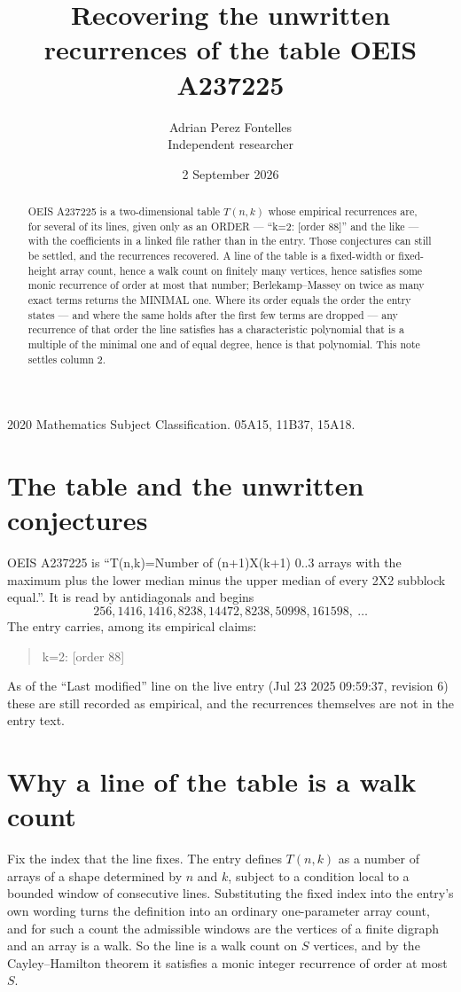 \documentclass[11pt,a4paper]{article}
\title{Recovering the unwritten recurrences of the table OEIS A237225}
\author{Adrian Perez Fontelles\\ \small Independent researcher}
\date{2 September 2026}
\theoremstyle{plain}
\theoremstyle{definition}
\begin{document}
\maketitle

\begin{abstract}
OEIS A237225 is a two-dimensional table $T(n,k)$ whose empirical recurrences are, for several of
its lines, given only as an ORDER --- ``k=2: [order 88]'' and the like --- with the
coefficients in a linked file rather than in the entry. Those conjectures can still be settled,
and the recurrences recovered. A line of the table is a fixed-width or fixed-height array
count, hence a walk count on finitely many vertices, hence satisfies some monic recurrence of
order at most that number; Berlekamp--Massey on twice as many exact terms returns the MINIMAL
one. Where its order equals the order the entry states --- and where the same holds after the
first few terms are dropped --- any recurrence of that order the line satisfies has a
characteristic polynomial that is a multiple of the minimal one and of equal degree, hence is
that polynomial. This note settles column 2.
\end{abstract}

\noindent\small 2020 Mathematics Subject Classification. 05A15, 11B37, 15A18.\normalsize

\section{The table and the unwritten conjectures}

OEIS A237225 is ``T(n,k)=Number of (n+1)X(k+1) 0..3 arrays with the maximum plus the lower median minus the upper median of every 2X2 subblock equal.''. It is read by antidiagonals and begins
\[
256, 1416, 1416, 8238, 14472, 8238, 50998, 161598,\ \dots
\]
The entry carries, among its empirical claims:
\begin{quote}\small
k=2: [order 88]
\end{quote}
As of the ``Last modified'' line on the live entry (Jul 23 2025 09:59:37, revision 6) these are still
recorded as empirical, and the recurrences themselves are not in the entry text.

\section{Why a line of the table is a walk count}

Fix the index that the line fixes. The entry defines $T(n,k)$ as a number of arrays of a shape
determined by $n$ and $k$, subject to a condition local to a bounded window of consecutive
lines. Substituting the fixed index into the entry's own wording turns the definition into an
ordinary one-parameter array count, and for such a count the admissible windows are the
vertices of a finite digraph and an array is a walk. So the line is a walk count on $S$
vertices, and by the Cayley--Hamilton theorem it satisfies a monic integer recurrence of order
at most $S$.
\end{document}

